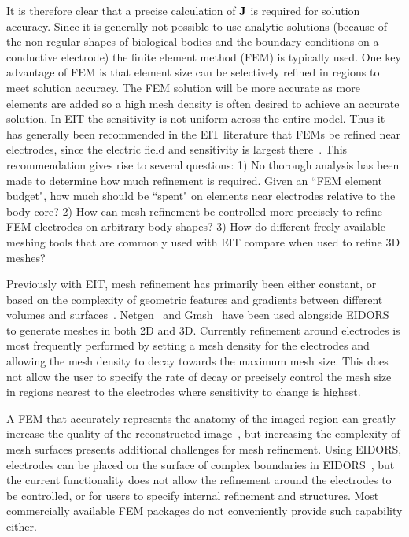 \documentclass[12pt]{iopart}
\begin{document}
It is therefore clear that a precise  calculation of $\bf J$ is
required for solution accuracy. Since it is generally not
possible to use analytic solutions (because of the non-regular
shapes of biological bodies and the boundary conditions on a
conductive electrode) the finite element method (FEM) is typically
used. 
One key advantage of FEM is that element size can be
selectively refined in regions to meet solution accuracy. 
The FEM solution will be more accurate as more elements are
added so a high mesh density is often desired to achieve an 
accurate solution. In EIT the sensitivity is not uniform 
across the entire model.
Thus
it has generally been recommended in the EIT literature 
that FEMs be refined near electrodes, since the electric
field and sensitivity is largest there~\parencite{adler_electrical_2017}. 
This recommendation gives rise to several questions: 
1) No thorough analysis has been made to determine how much 
refinement is required. Given an ``FEM element budget", how
much should be ``spent" on elements near electrodes relative to 
the body core?
2) How can mesh refinement be controlled more precisely 
to refine FEM electrodes on arbitrary
body shapes? 
3) How do different freely available meshing tools that are
commonly used with EIT compare when used to refine 3D meshes?

Previously with EIT, mesh refinement has primarily been either 
constant, or based on 
the complexity of geometric features
and gradients between different volumes and surfaces~\parencite{grychtol_fem_2013}.  
Netgen~\parencite{schoberl_netgen_1997} and Gmsh~\parencite{geuzaine_gmsh_2009} have been used alongside 
EIDORS~\parencite{adler_uses_2006} to generate meshes in both 2D and 3D. 
Currently refinement around electrodes is most frequently performed by 
setting a mesh density for the electrodes and allowing the mesh density to 
decay towards the maximum mesh size. This does not allow the user to specify 
the rate of decay or precisely control the mesh size in regions nearest to 
the  electrodes where sensitivity to change is highest.

A FEM that accurately represents the anatomy of the imaged region 
can greatly increase the quality of the reconstructed image~\parencite{grychtol_impact_2012},
but increasing the complexity of mesh surfaces presents additional challenges for
mesh refinement. Using EIDORS,  electrodes can be placed on the surface of complex boundaries in 
EIDORS~\parencite{grychtol_fem_2013}, but the current functionality does not allow the
refinement around the electrodes to be controlled, or for users to specify internal 
refinement and structures.
Most commercially available FEM packages
do not conveniently provide such capability either.
\end{document}
